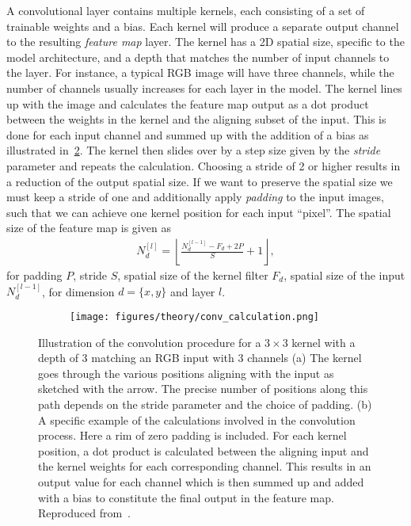 A convolutional layer contains multiple kernels, each consisting of a set of
trainable weights and a bias. Each kernel will produce a separate output channel
to the resulting \textit{feature map} layer. The kernel has a 2D spatial size,
specific to the model architecture, and a depth that matches the number of input
channels to the layer. For instance, a typical RGB image will have three
channels, while the number of channels usually increases for each layer in the
model. The kernel lines up with the image and calculates the feature map output
as a dot product between the weights in the kernel and the aligning subset of
the input. This is done for each input channel and summed up with the addition
of a bias as illustrated in~\cref{fig:conv_example}. The kernel then slides over by a
step size given by the \textit{stride} parameter and repeats the
calculation. Choosing a stride of 2 or higher results in a reduction of the
output spatial size. If we want to preserve the spatial size we must keep a
stride of one and additionally apply \textit{padding} to the input images, such
that we can achieve one kernel position for each input ``pixel''. The spatial
size of the feature map is given as
\begin{align}
  N_d^{[l]} = \left\lfloor \frac{N_d^{[l-1]} - F_d + 2P}{S} + 1 \right\rfloor,
  \label{eq:down_scaling}
\end{align}
for padding $P$, stride $S$, spatial size of the kernel filter $F_d$, spatial
size of the input $N_d^{[l-1]}$, for dimension $d = \{x, y\}$ and layer $l$. 


\begin{figure}[!htb]
  \centering
  \begin{subfigure}[t]{0.26\textwidth}
    \centering
    \raggedleft
    \caption{}
  \end{subfigure}
  \hfill
  \begin{subfigure}[t]{0.70\textwidth}
    \centering
    \texttt{[image: figures/theory/conv\_calculation.png]}
    \caption{}
    \label{fig:conv_calculation}
  \end{subfigure}
  \hfill
  \caption{Illustration of the convolution procedure for a $3 \times 3$ kernel with a depth of 3 matching an RGB input with 3 channels (a) The kernel goes through the various positions aligning with the input as sketched with the arrow. The precise number of positions along this path depends on the stride parameter and the choice of padding. (b) A specific example of the calculations involved in the convolution process. Here a rim of zero padding is included. For each kernel position, a dot product is calculated between the aligning input and the kernel weights for each corresponding channel. This results in an output value for each channel which is then summed up and added with a bias to constitute the final output in the feature map. Reproduced from~\cite{CNN_calc}.}
  \label{fig:conv_example}
\end{figure}


